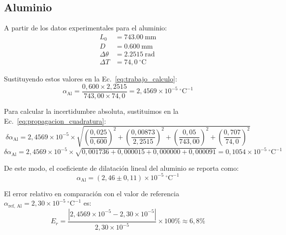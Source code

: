 \subsection{Aluminio}

A partir de los datos experimentales para el aluminio:
\begin{align*}
    L_0 &= \qty{743,00}{\milli\meter} \\
    D &= \qty{0,600}{\milli\meter} \\
    \Delta\theta &= \qty{2,2515}{\radian} \\
    \Delta T &= 74{,}0\ ^\circ\text{C}
\end{align*}

Sustituyendo estos valores en la Ec.~\eqref{eq:trabajo_calculo}:
\begin{equation*}
    \alpha_{\text{Al}} = \frac{0{,}600 \times 2{,}2515}{743{,}00 \times 74{,}0} = 2{,}4569 \times 10^{-5}\ ^\circ\text{C}^{-1}
\end{equation*}

Para calcular la incertidumbre absoluta, sustituimos en la Ec.~\eqref{eq:propagacion_cuadratura}:
\begin{equation*}
    \delta\alpha_{\text{Al}} = 2{,}4569 \times 10^{-5} \times \sqrt{
        \left(\frac{0{,}025}{0{,}600}\right)^2 +
        \left(\frac{0{,}00873}{2{,}2515}\right)^2 +
        \left(\frac{0{,}05}{743{,}00}\right)^2 +
        \left(\frac{0{,}707}{74{,}0}\right)^2
    }
\end{equation*}
\begin{equation*}
    \delta\alpha_{\text{Al}} = 2{,}4569 \times 10^{-5} \times \sqrt{
        0{,}001736 + 0{,}000015 + 0{,}000000 + 0{,}000091
    } = 0{,}1054 \times 10^{-5}\ ^\circ\text{C}^{-1}
\end{equation*} 

De este modo, el coeficiente de dilatación lineal del aluminio se reporta como:
\begin{equation}
    \alpha_{\text{Al}} = (2{,}46 \pm 0{,}11) \times 10^{-5}\ ^\circ\text{C}^{-1}
    \label{eq:res_al}
\end{equation}

El error relativo en comparación con el valor de referencia $\alpha_{\text{ref, Al}} = 2{,}30 \times 10^{-5}\ ^\circ\text{C}^{-1}$ es:
\begin{equation*}
    E_r = \frac{|2{,}4569 \times 10^{-5} - 2{,}30 \times 10^{-5}|}{2{,}30 \times 10^{-5}} \times 100\% \approx 6{,}8\%
\end{equation*}

